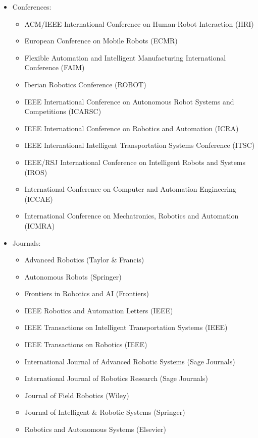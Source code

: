 \begin{itemize}[nosep]
\item Conferences:
  \begin{itemize}[nosep]
  \item ACM/IEEE International Conference on Human-Robot Interaction (HRI)
  \item European Conference on Mobile Robots (ECMR)
  \item Flexible Automation and Intelligent Manufacturing International Conference (FAIM)
  \item Iberian Robotics Conference (ROBOT)
  \item IEEE International Conference on Autonomous Robot Systems and Competitions (ICARSC)
  \item IEEE International Conference on Robotics and Automation (ICRA)
  \item IEEE International Intelligent Transportation Systems Conference (ITSC)
  \item IEEE/RSJ International Conference on Intelligent Robots and Systems (IROS)
  \item International Conference on Computer and Automation Engineering (ICCAE)
  \item International Conference on Mechatronics, Robotics and Automation (ICMRA)
  \end{itemize}
\item Journals:
  \begin{itemize}[nosep]
  \item Advanced Robotics (Taylor \& Francis)
  \item Autonomous Robots (Springer)
  \item Frontiers in Robotics and AI (Frontiers)
  \item IEEE Robotics and Automation Letters (IEEE)
  \item IEEE Transactions on Intelligent Transportation Systems (IEEE)
  \item IEEE Transactions on Robotics (IEEE)
  \item International Journal of Advanced Robotic Systems (Sage Journals)
  \item International Journal of Robotics Research (Sage Journals)
  \item Journal of Field Robotics (Wiley)
  \item Journal of Intelligent \& Robotic Systems (Springer)
  \item Robotics and Autonomous Systems (Elsevier)
  \end{itemize}
\end{itemize}


